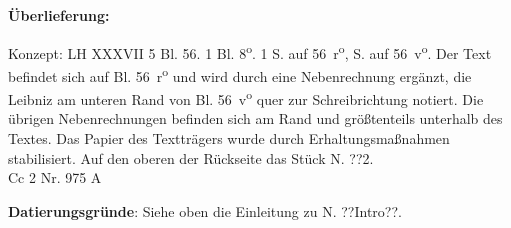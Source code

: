 	\begin{ledgroupsized}[r]{120mm}
	\footnotesize 
	\pstart 
	\noindent\textbf{\"{U}berlieferung:}
	\pend
	\end{ledgroupsized}
	\begin{ledgroupsized}[r]{114mm}
	\footnotesize 
	\pstart \parindent -6mm
	Konzept: LH XXXVII 5 Bl. 56. 1 Bl. 8\textsuperscript{o}. 1 S. auf 56~r\textsuperscript{o},  S. auf 56~v\textsuperscript{o}. Der Text befindet sich auf Bl. 56~r\textsuperscript{o} und wird durch eine Nebenrechnung erg\"{a}nzt, die Leibniz am unteren Rand von Bl. 56~v\textsuperscript{o} quer zur Schreibrichtung notiert. Die \"{u}brigen Neben\-rechnungen befinden sich am Rand und gr\"{o}{\ss}tenteils unterhalb des Textes. Das Papier des Texttr\"{a}gers wurde durch Erhaltungsma{\ss}nahmen stabilisiert. Auf den oberen  der R\"{u}ckseite das St\"{u}ck N. ??2.\\Cc 2 Nr. 975 A\pend
	\end{ledgroupsized}
	\vspace*{5mm}
	\begin{ledgroup}
	\footnotesize
	\pstart
	\noindent\footnotesize{\textbf{Datierungsgr\"{u}nde}: Siehe oben die Einleitung zu N. ??Intro??.}\pend
	\end{ledgroup}
	
